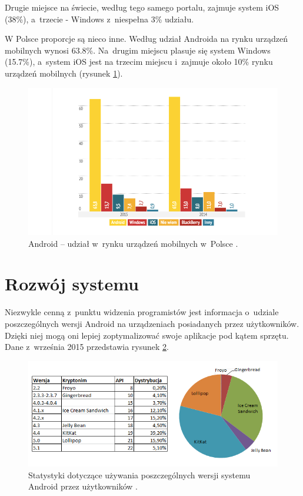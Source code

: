 Drugie miejsce na świecie, według tego samego portalu, zajmuje system iOS (38\%), a~trzecie - Windows z~niespełna 3\% udziału. 

W Polsce proporcje są nieco inne. Według \cite{website:android:stat1} udział Androida na rynku urządzeń mobilnych wynosi 63.8\%. Na~drugim miejscu plasuje się system Windows (15.7\%), a~system iOS jest na trzecim miejscu i~zajmuje około 10\% rynku urządzeń mobilnych (rysunek \ref{fig:android_udzial_polska}).

\begin{figure}[!htb]
    \centering
    \includegraphics[width=15cm]{imgs/ch2_android_udzial_1.png}
    \caption
{Android – udział w~rynku urządzeń mobilnych w~Polsce \cite{website:android:stat1}.}
    \label{fig:android_udzial_polska}
\end{figure} 

\newpage

\section{Rozwój systemu}
Niezwykle cenną z~punktu widzenia programistów jest informacja o~udziale poszczególnych wersji Android na urządzeniach posiadanych przez użytkowników. Dzięki niej mogą oni lepiej zoptymalizować swoje aplikacje pod kątem sprzętu. Dane z~września 2015 przedstawia rysunek \ref{fig:android_udzial_wersje}.

\begin{figure}[!htb]
    \centering
    \includegraphics[width=17cm]{imgs/ch2_android_udzial_3pl.png}
    \caption
{Statystyki dotyczące używania poszczególnych wersji systemu Android przez użytkowników \cite{website:android:now}.}
    \label{fig:android_udzial_wersje}
\end{figure} 

